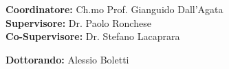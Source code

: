 \begin{titlepage}
  \vspace{1 cm}
  \begin{flushleft}
    \begin{minipage}{0.8\textwidth}
      \begin{flushleft} \large
        \textbf{Coordinatore:} Ch.mo Prof. Gianguido Dall'Agata\\
        \vspace{5mm}
        \textbf{Supervisore:} Dr. Paolo Ronchese\\
        \vspace{5mm}
        \textbf{Co-Supervisore:} Dr. Stefano Lacaprara\\
        \vspace{1cm} %
      \end{flushleft}
    \end{minipage}
  \end{flushleft}
  \vspace{1cm}
  \begin{flushright}
    \begin{minipage}{0.5\textwidth}
      \begin{flushright}
        \large \textbf{Dottorando:} Alessio Boletti\\
      \end{flushright}
    \end{minipage}
  \end{flushright}
\end{titlepage}
